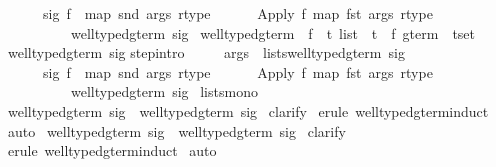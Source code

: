 \begin{isabellebody}
\ \ \ \ \ \ sig\ f\ {\isacharequal}\ {\isacharparenleft}map\ snd\ args{\isacharcomma}\ rtype{\isacharparenright}{\isasymrbrakk}\isanewline
\ \ \ \ \ {\isasymLongrightarrow}\ {\isacharparenleft}Apply\ f\ {\isacharparenleft}map\ fst\ args{\isacharparenright}{\isacharcomma}\ rtype{\isacharparenright}\ \isanewline
\ \ \ \ \ \ \ \ \ {\isasymin}\ well{\isacharunderscore}typed{\isacharunderscore}gterm\ sig{\isachardoublequote}\isanewline
\isanewline
{}\ well{\isacharunderscore}typed{\isacharunderscore}gterm{\isacharprime}\ {\isacharcolon}{\isacharcolon}\ {\isachardoublequote}{\isacharparenleft}{\isacharprime}f\ {\isasymRightarrow}\ {\isacharprime}t\ list\ {\isacharasterisk}\ {\isacharprime}t{\isacharparenright}\ {\isasymRightarrow}\ {\isacharparenleft}{\isacharprime}f\ gterm\ {\isacharasterisk}\ {\isacharprime}t{\isacharparenright}set{\isachardoublequote}\isanewline
{}\ {\isachardoublequote}well{\isacharunderscore}typed{\isacharunderscore}gterm{\isacharprime}\ sig{\isachardoublequote}\isanewline
{}\isanewline
step{\isacharbrackleft}intro{\isacharbang}{\isacharbrackright}{\isacharcolon}\ \isanewline
\ \ \ \ {\isachardoublequote}{\isasymlbrakk}args\ {\isasymin}\ lists{\isacharparenleft}well{\isacharunderscore}typed{\isacharunderscore}gterm{\isacharprime}\ sig{\isacharparenright}{\isacharsemicolon}\ \isanewline
\ \ \ \ \ \ sig\ f\ {\isacharequal}\ {\isacharparenleft}map\ snd\ args{\isacharcomma}\ rtype{\isacharparenright}{\isasymrbrakk}\isanewline
\ \ \ \ \ {\isasymLongrightarrow}\ {\isacharparenleft}Apply\ f\ {\isacharparenleft}map\ fst\ args{\isacharparenright}{\isacharcomma}\ rtype{\isacharparenright}\ \isanewline
\ \ \ \ \ \ \ \ \ {\isasymin}\ well{\isacharunderscore}typed{\isacharunderscore}gterm{\isacharprime}\ sig{\isachardoublequote}\isanewline
{}\ lists{\isacharunderscore}mono\isanewline
\isanewline
\isanewline
{}\ {\isachardoublequote}well{\isacharunderscore}typed{\isacharunderscore}gterm\ sig\ {\isasymsubseteq}\ well{\isacharunderscore}typed{\isacharunderscore}gterm{\isacharprime}\ sig{\isachardoublequote}\isanewline
{}\ clarify\isanewline
{}\ {\isacharparenleft}erule\ well{\isacharunderscore}typed{\isacharunderscore}gterm{\isachardot}induct{\isacharparenright}\isanewline
{}\ auto\isanewline
{}\isanewline
\isanewline
{}\ {\isachardoublequote}well{\isacharunderscore}typed{\isacharunderscore}gterm{\isacharprime}\ sig\ {\isasymsubseteq}\ well{\isacharunderscore}typed{\isacharunderscore}gterm\ sig{\isachardoublequote}\isanewline
{}\ clarify\isanewline
{}\ {\isacharparenleft}erule\ well{\isacharunderscore}typed{\isacharunderscore}gterm{\isacharprime}{\isachardot}induct{\isacharparenright}\isanewline
{}\ auto\isanewline
{}\isanewline
\isanewline
\isanewline
{}\isanewline
\isanewline
\end{isabellebody}%
